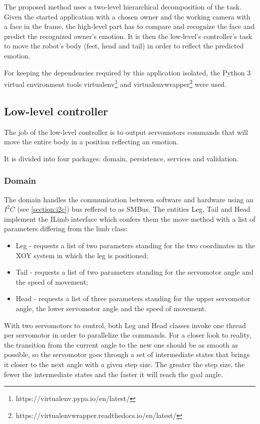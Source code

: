 \documentclass[runningheads,a4paper,12pt]{report}
\begin{document}
The proposed method uses a two-level hierarchical decomposition of the task. Given the started application with a chosen owner and the working camera with a face in the frame, the high-level part has to compare and recognize the face and predict the recognized owner's emotion. It is then the low-level's controller's task to move the robot's body (feet, head and tail) in order to reflect the predicted emotion. 

For keeping the dependencies required by this application isolated, the Python 3 virtual environment tools virtualenv\footnote{https://virtualenv.pypa.io/en/latest/} and virtualenvwrapper\footnote{https://virtualenvwrapper.readthedocs.io/en/latest/} were used. 

\subsection*{Low-level controller}
The job of the low-level controller is to output servomotors commands that will move the entire body in a position reflecting an emotion.

It is divided into four packages: domain, persistence, services and validation. 

\subsubsection{Domain}
The domain handles the communication between software and hardware using an $I^2C$ (see \ref{section:i2c}) bus reffered to as SMBus. The entities Leg, Tail and Head implement the ILimb interface which confers them the move method with a list of parameters differing from the limb class:
\begin{itemize}
\item Leg - requests a list of two parameters standing for the two coordinates in the XOY system in which the leg is positioned;
\item Tail - requests a list of two parameters standing for the servomotor angle and the speed of movement;
\item Head - requests a list of three parameters standing for the upper servomotor angle, the lower servomotor angle and the speed of movement.
\end{itemize}

With two servomotors to control, both Leg and Head classes invoke one thread per servomotor in order to parallelize the commands. For a closer look to reality, the transition from the current angle to the new one should be as smooth as possible, so the servomotor goes through a set of intermediate states that brings it closer to the next angle with a given step size. The greater the step size, the fewer the intermediate states  and the faster it will reach the goal angle. 
\end{document}
